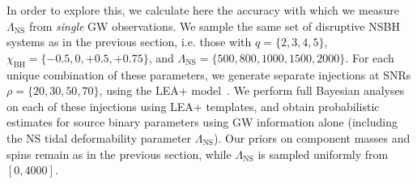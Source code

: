 \documentclass[aps,prd,amsmath,floats,floatfix, twocolumn,
superscriptaddress,nofootinbib,showpacs]{revtex4-1}
\newcommand{\lambdans}{\Lambda_\mathrm{NS}}
\newcommand{\chibh}{\chi_\mathrm{BH}}
\begin{document}
%
% 
% 
In order to explore this, we calculate here the accuracy with which we measure
$\lambdans$ from {\it single} GW observations. We sample the same set of
disruptive NSBH systems as in the previous section, i.e. those with
$q=\{2,3,4,5\}$, $\chibh=\{-0.5,0,+0.5,+0.75\}$, and $\lambdans=\{500, 800, 1000, 1500, 2000\}$.
For each unique combination of these parameters, we generate separate injections
at SNRs $\rho=\{20,30,50,70\}$, using the LEA+ model~\cite{Lackey:2013axa}. We
perform full Bayesian analyses on each of these injections using LEA+ templates,
and obtain probabilistic estimates for source binary parameters using GW information
alone (including the NS tidal deformability parameter $\lambdans$). Our priors
on component masses and spins remain as in the previous section, while $\lambdans$
is sampled uniformly from $[0,4000]$.
\end{document}
